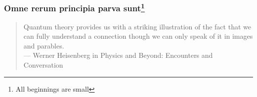 
\begin{frame}
  \frametitle{Omne rerum principia parva sunt\footnote{All beginnings are small}}
  \mbox{}\vfill%
  \begin{quote}
    Quantum theory provides us with a striking illustration of the fact
    that we can fully understand a connection though we can only speak of
    it in images and parables.\\
    --- Werner Heisenberg in Physics and Beyond: Encounters and Conversation
  \end{quote}
  \vfill\mbox{}
\end{frame}
